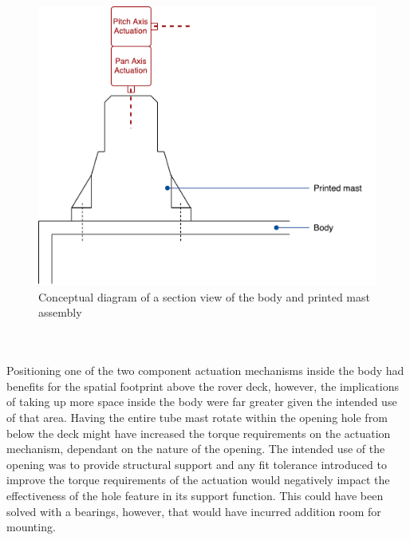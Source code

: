 \begin{itemize}
        \begin{figure}[H]
          \centering
          \includegraphics[width=0.7\linewidth]{figures/concepts-printedMast}
          \caption[Conceptual diagram of a section view of the body and printed mast assembly]{Conceptual diagram of a section view of the body and printed mast assembly}
          \label{fig:concepts-printedMast}
        \end{figure}
        
      \end{itemize}
      
      \\\\
        Positioning one of the two component actuation mechanisms inside the body had benefits for the spatial footprint above the rover deck, however, the implications of taking up more space inside the body were far greater given the intended use of that area. Having the entire tube mast rotate within the opening hole from below the deck might have increased the torque requirements on the actuation mechanism, dependant on the nature of the opening. The intended use of the opening was to provide structural support and any fit tolerance introduced to improve the torque requirements of the actuation would negatively impact the effectiveness of the hole feature in its support function. This could have been solved with a bearings, however, that would have incurred addition room for mounting.
      
